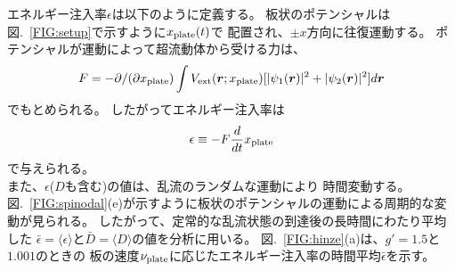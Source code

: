 \documentclass[12pt,a4paper]{jbook}
\begin{document}
        エネルギー注入率$\epsilon$は以下のように定義する。
        板状のポテンシャルは図.~\ref{FIG:setup}で示すように$x_{\rm plate}(t)$で
        配置され、$\pm x$方向に往復運動する。 
        ポテンシャルが運動によって超流動体から受ける力は、
        \begin{eqnarray}
            F = -\partial / (\partial x_{\rm plate}) \int
            V_{\rm ext}(\bm{r}; x_{\rm plate}) [|\psi_1(\bm{r})|^2 + |\psi_2(\bm{r})|^2]
            d\bm{r}
        \end{eqnarray}
        でもとめられる。
        したがってエネルギー注入率は
        \begin{eqnarray}
            \epsilon \equiv -F \frac{d}{dt} x_{\rm plate}
        \end{eqnarray}
        で与えられる。
        \\
        また、$\epsilon$($D$も含む)の値は、乱流のランダムな運動により
        時間変動する。
        図.~\ref{FIG:spinodal}(e)が示すように板状のポテンシャルの運動による周期的な変動が見られる。
        したがって、定常的な乱流状態の到達後の長時間にわたり平均した
        $\bar\epsilon = \langle \epsilon \rangle$と$\bar D = \langle D \rangle$の値を分析に用いる。
        図.~\ref{FIG:hinze}(a)は、$g'=1.5$と$1.001$のときの
        板の速度$\nu_{\rm plate}$に応じたエネルギー注入率の時間平均$\bar\epsilon$を示す。
\end{document}
